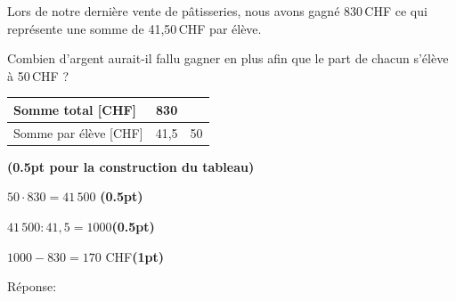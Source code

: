 
\question[3]
Lors de notre dernière vente de pâtisseries, nous avons gagné 830\,CHF ce qui représente une somme de 41,50\,CHF par élève. 

\vspace{10pt}
Combien d'argent aurait-il fallu gagner en plus afin que le part de chacun s’élève à 50\,CHF ?

\vspace{10pt}{\footnotesize\raggedleft Espace pour ta démarche et tes calculs\par}
\begin{solutionorgrid}[140pt]

\vspace{5pt}
\def\arraystretch{1.5}
\begin{tabularx}{0.5\textwidth}{l|C|C|}
Somme total [CHF]&830&\\
\hline
Somme par élève [CHF]&41,5&50\\
\end{tabularx}
\def\arraystretch{1.5}

\hfill\textbf{(0.5pt pour la construction du tableau)}

\vspace{15pt}$50 \cdot 830 = 41\,500$ \hfill\textbf{(0.5pt)}

\vspace{5pt}$41\,500 : 41,5 = 1000$\hfill\textbf{(0.5pt)}

\vspace{5pt}$1000 - 830 = 170$ CHF\hfill\textbf{(1pt)}

\end{solutionorgrid}

\begin{tcolorbox}[enhanced jigsaw, interior hidden, colframe=box, parbox=false]%
Réponse: 
\end{tcolorbox}

